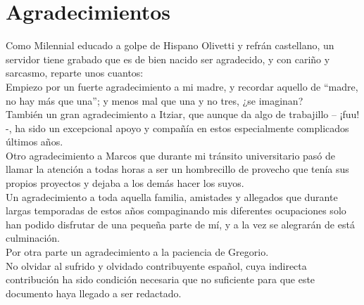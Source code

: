 
\chapter*{Agradecimientos}

Como Milennial educado a golpe de Hispano Olivetti y refrán castellano, un servidor tiene grabado que es de bien nacido ser agradecido, y con cariño y sarcasmo, reparte unos cuantos:\\


Empiezo por un fuerte agradecimiento a mi madre, y recordar aquello de “madre, no hay más que una”; y menos mal que una y no tres, ¿se imaginan?\\


También un gran agradecimiento a Itziar, que aunque da algo de trabajillo – ¡fuu! -, ha sido un excepcional apoyo y compañía en estos especialmente complicados últimos años.\\


Otro agradecimiento a Marcos que durante mi tránsito universitario pasó de llamar la atención a todas horas a ser un hombrecillo de provecho que tenía sus propios proyectos y dejaba a los demás hacer los suyos.\\


Un agradecimiento a toda aquella familia, amistades y allegados que durante largas temporadas de estos años compaginando mis diferentes ocupaciones solo han podido disfrutar de una pequeña parte de mí, y a la vez se alegrarán de está culminación.\\


Por otra parte un agradecimiento a la paciencia de Gregorio.\\


No olvidar al sufrido y olvidado contribuyente español, cuya indirecta contribución ha sido condición necesaria que no suficiente para que este documento haya llegado a ser redactado.




